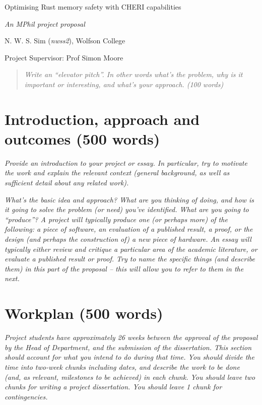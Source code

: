 \documentclass[11pt]{article}
\begin{document}
\centerline{\Large Optimising Rust memory safety with CHERI capabilities}
\vspace{2em}
\centerline{\Large \emph{An MPhil project proposal}}
\vspace{2em}
\centerline{\large N. W. S. Sim (\emph{nwss2}), Wolfson College}
\vspace{1em}
\centerline{\large Project Supervisor: Prof Simon Moore}
\vspace{1em}

\begin{abstract}
\textsl{Write an ``elevator pitch''. In other words what's the
  problem, why is it important or interesting, and what's your approach. (100 words)} 
\end{abstract}

\section{Introduction, approach and outcomes (500 words)}

\textsl{Provide an introduction to your project or essay. In particular, try to
  motivate the work and explain the relevant context (general
  background, as well as sufficient detail about any related
  work).}

\textsl{What's the basic idea and approach? What are you thinking of 
doing, and how is it going to solve the problem (or need) you've 
identified. What are you going to ``produce''? 
A project will typically produce one (or perhaps more) of the following:
a piece of software, an evaluation of a published result, a proof, or
the design (and perhaps the construction of) a new piece of hardware. An
essay will typically either review and critique a particular area of the
academic literature, or evaluate a published result or proof. Try to 
name the specific things (and describe them) in this part of the 
proposal -- this will allow you to refer to them in the next.} 

\section{Workplan (500 words)}
\textsl{Project students have approximately 26 weeks between the approval of 
the proposal by the Head of Department, and the submission of the dissertation. This section
should account for what you intend to do during that time. You should divide the time into two-week chunks including dates, and 
describe the work to be done (and, as relevant, milestones to be 
achieved) in each chunk. You should leave two 
chunks for writing a project dissertation. You should leave 1 chunk for contingencies.} 

\newpage
\appendix
\end{document}
